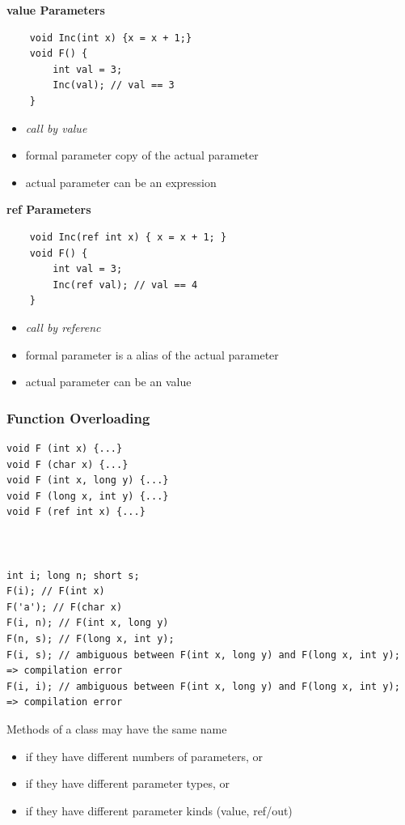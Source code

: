 \textbf{value Parameters}
\begin{multicols}{2}
	\begin{lstlisting}
	void Inc(int x) {x = x + 1;}
	void F() {
		int val = 3;
		Inc(val); // val == 3
	}
	\end{lstlisting}
	\columnbreak
	\begin{itemize}
		\item \textit{call by value}
		\item formal parameter copy of the actual parameter
		\item actual parameter can be an expression
	\end{itemize}
\end{multicols}

\textbf{ref Parameters}
\begin{multicols}{2}
	\begin{lstlisting}
	void Inc(ref int x) { x = x + 1; }
	void F() {
		int val = 3;
		Inc(ref val); // val == 4
	}
	\end{lstlisting}
	\columnbreak
	\begin{itemize}
		\item \textit{call by referenc}
		\item formal parameter is a alias of the actual parameter
		\item actual parameter can be an value
	\end{itemize}
\end{multicols}


\subsubsection{Function Overloading}
\begin{multicols}{2}
\begin{lstlisting}
void F (int x) {...}
void F (char x) {...}
void F (int x, long y) {...}
void F (long x, int y) {...}
void F (ref int x) {...}



int i; long n; short s;
F(i); // F(int x)
F('a'); // F(char x)
F(i, n); // F(int x, long y)
F(n, s); // F(long x, int y);
F(i, s); // ambiguous between F(int x, long y) and F(long x, int y); => compilation error
F(i, i); // ambiguous between F(int x, long y) and F(long x, int y); => compilation error
\end{lstlisting}
	\columnbreak
	Methods of a class may have the same name
	\begin{itemize}
		\item if they have different numbers of parameters, or
		\item if they have different parameter types, or
		\item if they have different parameter kinds (value, ref/out)
	\end{itemize}
\end{multicols}

